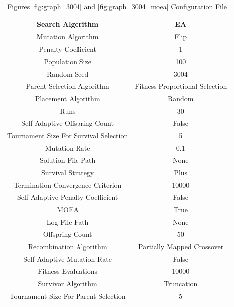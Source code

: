 \documentclass{standalone}
\begin{document}
\begin{table}[!htb]
	\centering
	\caption{Figures \ref{fig:graph_3004} and \ref{fig:graph_3004_moea} Configuration File}
	\label{tab:graph_3004}
	\begin{tabular}{| c | c |}
		\hline
		Search Algorithm		& EA		 \\
		\hline
		Mutation Algorithm		& Flip		 \\
		\hline
		Penalty Coefficient		& 1		 \\
		\hline
		Population Size		& 100		 \\
		\hline
		Random Seed		& 3004		 \\
		\hline
		Parent Selection Algorithm		& Fitness Proportional Selection		 \\
		\hline
		Placement Algorithm		& Random		 \\
		\hline
		Runs		& 30		 \\
		\hline
		Self Adaptive Offspring Count		& False		 \\
		\hline
		Tournament Size For Survival Selection		& 5		 \\
		\hline
		Mutation Rate		& 0.1		 \\
		\hline
		Solution File Path		& None		 \\
		\hline
		Survival Strategy		& Plus		 \\
		\hline
		Termination Convergence Criterion		& 10000		 \\
		\hline
		Self Adaptive Penalty Coefficient		& False		 \\
		\hline
		MOEA		& True		 \\
		\hline
		Log File Path		& None		 \\
		\hline
		Offspring Count		& 50		 \\
		\hline
		Recombination Algorithm		& Partially Mapped Crossover		 \\
		\hline
		Self Adaptive Mutation Rate		& False		 \\
		\hline
		Fitness Evaluations		& 10000		 \\
		\hline
		Survivor Algorithm		& Truncation		 \\
		\hline
		Tournament Size For Parent Selection		& 5		 \\
		\hline
	\end{tabular}
\end{table}
\end{document}
